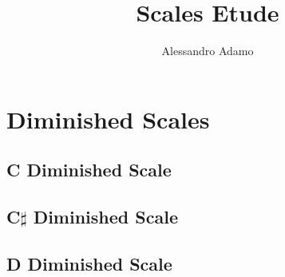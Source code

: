 \documentclass[12pt,a4paper,twoside,openright,titlepage]{book}
\title{Scales Etude}
\author{Alessandro Adamo}
\date{ }
\begin{document}
\maketitle
\tableofcontents
\chapter{Diminished Scales}
\section*{C Diminished Scale}
\begin{quote}
{%
\parindent 0pt
\noindent
\ifx\preLilyPondExample \undefined
\else
  \expandafter\preLilyPondExample
\fi
\def\lilypondbook{}%

\ifx\postLilyPondExample \undefined
\else
  \expandafter\postLilyPondExample
\fi
}
\end{quote}
\pagebreak
\section*{C$\sharp$ Diminished Scale}
\begin{quote}
{%
\parindent 0pt
\noindent
\ifx\preLilyPondExample \undefined
\else
  \expandafter\preLilyPondExample
\fi
\def\lilypondbook{}%

\ifx\postLilyPondExample \undefined
\else
  \expandafter\postLilyPondExample
\fi
}
\end{quote}
\pagebreak
\section*{D Diminished Scale}
\begin{quote}
{%
\parindent 0pt
\noindent
\ifx\preLilyPondExample \undefined
\else
  \expandafter\preLilyPondExample
\fi
\def\lilypondbook{}%

\ifx\postLilyPondExample \undefined
\else
  \expandafter\postLilyPondExample
\fi
}
\end{quote}
\pagebreak
\end{document}
